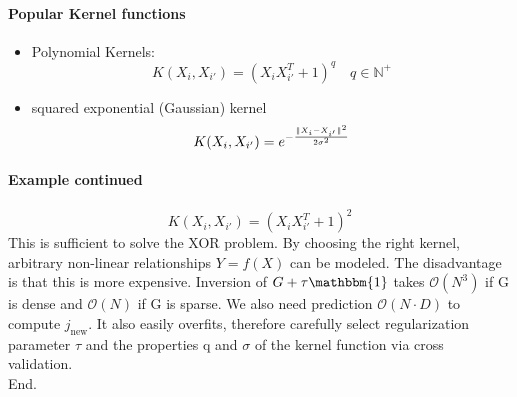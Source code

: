 \documentclass[11pt]{article}
\DeclarePairedDelimiter\norm{\lVert}{\rVert}
\begin{document}
    \noindent \paragraph{Popular Kernel functions}
    \begin{itemize}
      \item Polynomial Kernels:
      \begin{equation*}
        K(X_i, X_{i'})=(X_iX_{i'}^T+1)^q \quad q \in \mathbb{N}^+
      \end{equation*}
      \item squared exponential (Gaussian) kernel
      \begin{equation*}
        K(X_i, X_{i'})=e^{-\frac{\norm{X_i-X_{i'}}^2}{2\sigma^2}}
      \end{equation*}
    \end{itemize}
    \noindent \paragraph{Example continued}
    \begin{equation*}
      K(X_i, X_{i'})=(X_iX_{i'}^T+1)^2
    \end{equation*}
    This is sufficient to solve the XOR problem. By choosing the right kernel, arbitrary
    non-linear relationships $Y=f(X)$ can be modeled. The disadvantage is that
    this is more expensive. Inversion of $G+\tau \mathbbm{1}$ takes $\mathcal{O}(N^3)$
    if G is dense and $\mathcal{O}(N)$ if G is sparse. We also need prediction $
    \mathcal{O}(N\cdot D)$ to compute $j_{\text{new}}$. It also easily overfits,
    therefore carefully select regularization parameter $\tau$ and the properties
    q and $\sigma$ of the kernel function via cross validation.\\
    End.


























  
\end{document}
